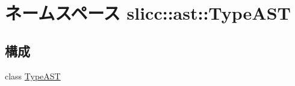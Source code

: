 \hypertarget{namespaceslicc_1_1ast_1_1TypeAST}{
\section{ネームスペース slicc::ast::TypeAST}
\label{namespaceslicc_1_1ast_1_1TypeAST}
}
\subsection*{構成}
\begin{DoxyCompactItemize}
\item 
class \hyperlink{classslicc_1_1ast_1_1TypeAST_1_1TypeAST}{TypeAST}
\end{DoxyCompactItemize}
